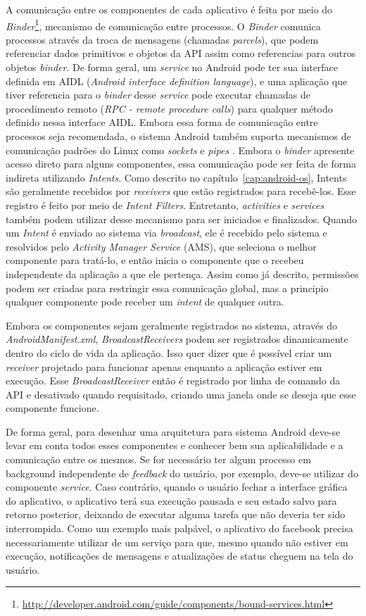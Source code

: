 A comunicação entre os componentes de cada aplicativo é feita por meio do \textit{Binder}\footnote{\url{http://developer.android.com/guide/components/bound-services.html}}, mecanismo de comunicação entre processos. O \textit{Binder} comunica processos através da troca de mensagens (chamadas \textit{parcels}), que podem referenciar dados primitivos e objetos da API assim como referencias para outros objetos \textit{binder}. De forma geral, um \textit{service} no Android pode ter sua interface definida em AIDL (\textit{Android interface definition language}), e uma aplicação que tiver referencia para o \textit{binder} desse \textit{service} pode executar chamadas de procedimento remoto (\textit{RPC - remote procedure calls}) para qualquer método definido nessa interface AIDL. Embora essa forma de comunicação entre processos seja recomendada, o sistema Android também suporta mecanismos de comunicação padrões do Linux como \textit{sockets} e \textit{pipes} \cite{heuser2014}. Embora o \textit{binder} apresente acesso direto para alguns componentes, essa comunicação pode ser feita de forma indireta utilizando \textit{Intents}. Como descrito no capítulo~\ref{cap:android-os}, Intents são geralmente recebidos por \textit{receivers} que estão registrados para recebê-los. Esse registro é feito por meio de \textit{Intent Filters}. Entretanto, \textit{activities} e \textit{services} também podem utilizar desse mecanismo para ser iniciados e finalizados. Quando um \textit{Intent} é enviado ao sistema via \textit{broadcast}, ele é recebido pelo sistema e resolvidos pelo \textit{Activity Manager Service} (AMS), que seleciona o melhor componente para tratá-lo, e então inicia o componente que o recebeu independente da aplicação a que ele pertença. Assim como já descrito, permissões podem ser criadas para restringir essa comunicação global, mas a principio qualquer componente pode receber um \textit{intent} de qualquer outra. 

Embora os componentes sejam geralmente registrados no sistema, através do \textit{AndroidManifest.xml}, \textit{BroadcastReceivers} podem ser registrados dinamicamente dentro do ciclo de vida da aplicação. Isso quer dizer que é possível criar um \textit{receiver} projetado para funcionar apenas enquanto a aplicação estiver em execução. Esse \textit{BroadcastReceiver} então é registrado por linha de comando da API e desativado quando requisitado, criando uma janela onde se deseja que esse componente funcione.

De forma geral, para desenhar uma arquitetura para sistema Android deve-se levar em conta todos esses componentes e conhecer bem sua aplicabilidade e a comunicação entre os mesmos. Se for necessário ter algum processo em background independente de \textit{feedback} do usuário, por exemplo, deve-se utilizar do componente \textit{service}. Caso contrário, quando o usuário fechar a interface gráfica do aplicativo, o aplicativo terá sua execução pausada e seu estado salvo para retorno posterior, deixando de executar alguma tarefa que não deveria ter sido interrompida. Como um exemplo mais palpável, o aplicativo do facebook precisa necessariamente utilizar de um serviço para que, mesmo quando não estiver em execução, notificações de mensagens e atualizações de status cheguem na tela do usuário.

